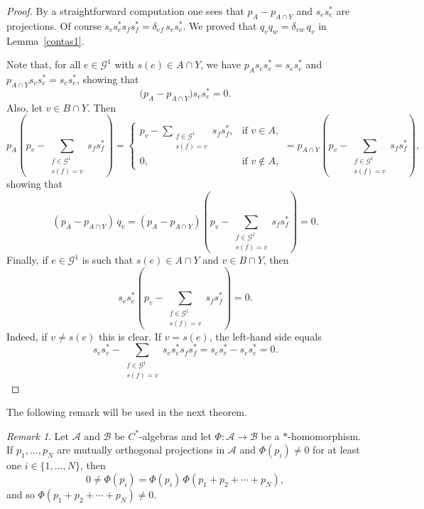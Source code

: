 \documentclass[12pt, reqno]{amsart}
\theoremstyle{definition}
\theoremstyle{remark}
\newtheorem{remark}[theorem]{Remark}
\numberwithin{equation}{section}
\newcommand{\G}{\mathcal{G}}
\begin{document}
\begin{proof}
By a straightforward computation one sees that $p_A - p_{A \cap Y}$ and $s_e s_e^*$ are projections.
Of course $s_e s_e^* s_f s_f^* = \delta_{ef}\, s_e s_e^*$. We proved that
$q_v q_w = \delta_{vw}\, q_v$ in Lemma~\ref{contas1}.

Note that, for all $e \in \G^1$ with $s(e) \in A \cap Y$, we have
$p_A s_e s_e^* = s_e s_e^*$ and $p_{A \cap Y} s_e s_e^* = s_e s_e^*$, showing that
\[
\bigl( p_A - p_{A \cap Y} \bigr) s_e s_e^* = 0.
\]
Also, let $v \in B \cap Y$. Then
\[
p_A \!\left(p_v - \sum_{\substack{f \in \G^1 \\ s(f) = v}} s_f s_f^* \right)
=
\begin{cases}
p_v - \displaystyle\sum_{\substack{f \in \G^1 \\ s(f) = v}} s_f s_f^*, & \text{if } v \in A,\\[10pt]
0, & \text{if } v \notin A,
\end{cases}
=
p_{A \cap Y} \!\left(p_v - \sum_{\substack{f \in \G^1 \\ s(f) = v}} s_f s_f^* \right),
\]
showing that
\[
(p_A - p_{A \cap Y})\, q_v
=
(p_A - p_{A \cap Y}) \!\left(p_v - \sum_{\substack{f \in \G^1 \\ s(f) = v}} s_f s_f^* \right)
= 0.
\]
Finally, if $e \in \G^1$ is such that $s(e) \in A \cap Y$ and $v \in B \cap Y$, then
\[
s_e s_e^* \!\left(p_v - \sum_{\substack{f \in \G^1 \\ s(f) = v}} s_f s_f^* \right) = 0.
\]
Indeed, if $v \neq s(e)$ this is clear. If $v = s(e)$, the left-hand side equals
\[
s_e s_e^* - \sum_{\substack{f \in \G^1 \\ s(f) = v}} s_e s_e^* s_f s_f^*
= s_e s_e^* - s_e s_e^* = 0.
\]
\end{proof}

The following remark will be used in the next theorem.

\begin{remark}\label{Aux1condL}
Let $\mathcal{A}$ and $\mathcal{B}$ be $C^*$-algebras and let
$\Phi:\mathcal{A}\to\mathcal{B}$ be a $*$-homomorphism. If $p_1,\ldots,p_N$ are mutually
orthogonal projections in $\mathcal{A}$ and $\Phi(p_i)\neq 0$ for at least one
$i \in \{1,\ldots,N\}$, then
\[
0 \neq \Phi(p_i) = \Phi(p_i)\,\Phi(p_1 + p_2 + \cdots + p_N),
\]
and so $\Phi(p_1 + p_2 + \cdots + p_N) \neq 0$.
\end{remark}
\end{document}
